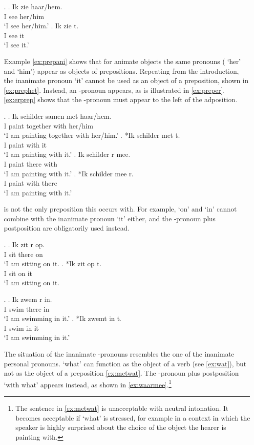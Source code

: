 \documentclass[11pt,a4paper]{article}
\begin{document}
 \ex. \label{ex:objverb}
 \ag. Ik zie haar/hem.\\
  I see her/him\\
  `I see her/him.'\label{ex:aniobj}
 \bg. Ik zie t.\\
  I see it\\
  `I see it.'\label{ex:inaniobj}

Example \ref{ex:prepani} shows that for animate objects the same pronouns ( `her' and  `him') appear as objects of prepositions. Repeating from the introduction, the inanimate pronoun  `it' cannot be used as an object of a preposition, shown in \ref{ex:prephet}. Instead, an -pronoun appears, as is illustrated in \ref{ex:preper}. \ref{ex:erprep} shows that the -pronoun must appear to the left of the adposition.

\ex. \label{ex:objprep}
\ag. Ik schilder samen met haar/hem.\\
 I paint together with her/him\\
 `I am painting together with her/him.'\label{ex:prepani}
\bg. *Ik schilder met t.\\
 I paint with it\\
 `I am painting with it.'\label{ex:prephet}
\bg. Ik schilder r mee.\\
 I paint there with\\
 `I am painting with it.'\label{ex:preper}
\bg. *Ik schilder mee r.\\
 I paint with there\\
 `I am painting with it.'\label{ex:erprep}

 is not the only preposition this occurs with. For example,  `on' and  `in' cannot combine with the inanimate pronoun  `it' either, and the -pronoun plus postposition are obligatorily used instead.

\ex.
\ag. Ik zit r op.\\
 I sit there on\\
 `I am sitting on it.
\bg. *Ik zit op t.\\
 I sit on it\\
 `I am sitting on it.

\ex.
 \ag. Ik zwem r in.\\
  I swim there in\\
  `I am swimming in it.'
 \bg. *Ik zwemt in t.\\
  I swim in it\\
  `I am swimming in it.'

The situation of the inanimate -pronouns resembles the one of the inanimate personal pronouns.  `what' can function as the object of a verb (see \ref{ex:wat}), but not as the object of a preposition \ref{ex:metwat}. The -pronoun plus postposition  `with what' appears instead, as shown in \ref{ex:waarmee}.\footnote{The sentence in \ref{ex:metwat} is unacceptable with neutral intonation. It becomes acceptable if  `what' is stressed, for example in a context in which the speaker is highly surprised about the choice of the object the hearer is painting with.}
\end{document}
